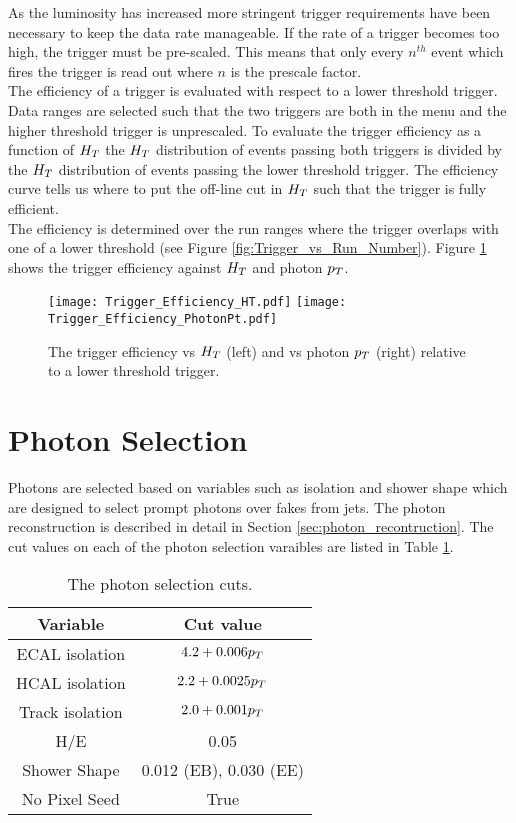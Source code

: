 As the luminosity has increased more stringent trigger requirements have been 
necessary to keep the data rate manageable. If the rate of a trigger becomes too
high, the trigger must be pre-scaled. This means that only every $n^{th}$ event 
which fires the trigger is read out where $n$ is the prescale factor. \\

The efficiency of a trigger is evaluated with respect to a lower threshold
trigger. Data ranges are selected such that the two triggers are both in the
menu and the higher threshold trigger is unprescaled. To evaluate the trigger
efficiency as a function of $H_{T}$ the $H_{T}$ distribution of events passing both
triggers is divided by the $H_{T}$ distribution of events passing the lower
threshold trigger. The efficiency curve tells us where to put the off-line cut 
in $H_{T}$ such that the trigger is fully efficient. \\

The efficiency is determined over the run ranges where the trigger overlaps with
one of a lower threshold (see Figure \ref{fig:Trigger_vs_Run_Number}). Figure 
\ref{fig:Trigger_Efficiency} shows the trigger efficiency against $H_{T}$ and 
photon $p_{T}$.

\begin{figure}
\texttt{[image: Trigger\_Efficiency\_HT.pdf]}
\texttt{[image: Trigger\_Efficiency\_PhotonPt.pdf]}
\caption{The trigger efficiency vs $H_{T}$ (left) and vs photon $p_{T}$ (right)
relative to a lower threshold trigger.}
\label{fig:Trigger_Efficiency}
\end{figure}

\section{Photon Selection}

Photons are selected based on variables such as isolation and shower shape which
are designed to select prompt photons over fakes from jets. The photon 
reconstruction is described in detail in Section \ref{sec:photon_recontruction}. 
The cut values on each of the photon selection varaibles are listed in Table 
\ref{tab:photoncuts}. 

\begin{table}
\begin{center}
\begin{tabular}{|c|c|}
\hline
Variable & Cut value \\
\hline
ECAL isolation & $4.2 + 0.006p_{T}$ \\
HCAL isolation & $2.2 + 0.0025p_{T}$ \\
Track isolation & $2.0 + 0.001p_{T}$ \\
H/E & 0.05 \\
Shower Shape & 0.012 (EB), 0.030 (EE) \\
No Pixel Seed & True \\
\hline
\end{tabular}
\end{center}
\caption{The photon selection cuts.}
\label{tab:photoncuts}
\end{table}

